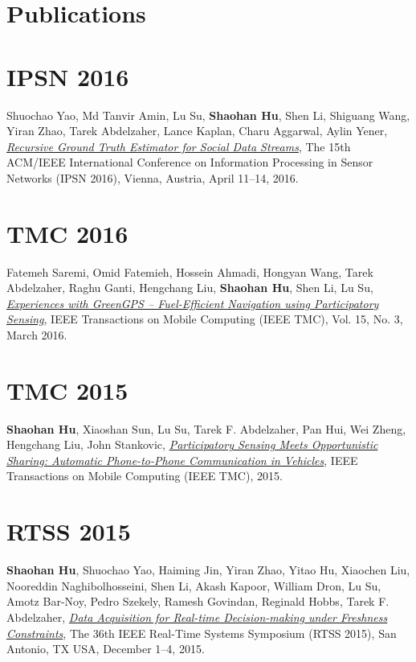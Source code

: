 \section{\sc Publications}

\section{\sc IPSN 2016}\hypertarget{wang2015ipsn}{} Shuochao Yao, Md Tanvir Amin, Lu Su, \textbf{Shaohan Hu}, Shen Li, Shiguang Wang, Yiran Zhao, Tarek Abdelzaher, Lance Kaplan, Charu Aggarwal, Aylin Yener, \href{}{\emph{Recursive Ground Truth Estimator for Social Data Streams}}, \textsf{The 15th ACM/IEEE International Conference on Information Processing in Sensor Networks (IPSN 2016)}, Vienna, Austria, April 11--14, 2016.

\section{\sc TMC 2016}\hypertarget{saremi2016tmc}{} Fatemeh Saremi, Omid Fatemieh, Hossein Ahmadi, Hongyan Wang, Tarek Abdelzaher, Raghu Ganti, Hengchang Liu, \textbf{Shaohan Hu}, Shen Li, Lu Su, \href{http://ieeexplore.ieee.org/xpl/articleDetails.jsp?tp=&arnumber=7084108}{\emph{Experiences with GreenGPS -- Fuel-Efficient Navigation using Participatory Sensing}}, \textsf{IEEE Transactions on Mobile Computing (IEEE TMC)}, Vol. 15, No. 3, March 2016.

\section{\sc TMC 2015}\hypertarget{hu2015tmc}{} \textbf{Shaohan Hu}, Xiaoshan Sun, Lu Su, Tarek F. Abdelzaher, Pan Hui, Wei Zheng, Hengchang Liu, John Stankovic, \href{http://ieeexplore.ieee.org/xpls/abs_all.jsp?arnumber=7337442}{\emph{Participatory Sensing Meets Opportunistic Sharing: Automatic Phone-to-Phone Communication in Vehicles}}, \textsf{IEEE Transactions on Mobile Computing (IEEE TMC)}, 2015.

\section{\sc RTSS 2015}\hypertarget{hu2015rtss}{} \textbf{Shaohan Hu}, Shuochao Yao, Haiming Jin, Yiran Zhao, Yitao Hu, Xiaochen Liu, Nooreddin Naghibolhosseini, Shen Li, Akash Kapoor, William Dron, Lu Su, Amotz Bar-Noy, Pedro Szekely, Ramesh Govindan, Reginald Hobbs, Tarek F. Abdelzaher, \href{http://ieeexplore.ieee.org/xpl/articleDetails.jsp?arnumber=7383576}{\emph{Data Acquisition for Real-time Decision-making under Freshness Constraints}}, \textsf{The 36th IEEE Real-Time Systems Symposium (RTSS 2015)}, San Antonio, TX USA, December 1--4, 2015.

